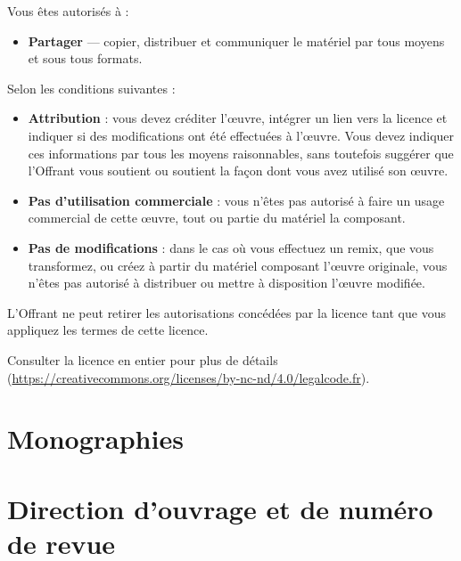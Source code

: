 \documentclass{article}
\begin{document}
\bigskip

    Vous êtes autorisés à :
    \begin{itemize}
        \item \textbf{Partager} --- copier, distribuer et communiquer le matériel par tous moyens et sous tous formats.
    \end{itemize}

\bigskip

    Selon les conditions suivantes :
    \begin{itemize}
        \item \textbf{Attribution} : vous devez créditer l'\oe{}uvre, intégrer un lien vers la licence et indiquer si des modifications ont été effectuées à l'\oe{}uvre. Vous devez indiquer ces informations par tous les moyens raisonnables, sans toutefois suggérer que l'Offrant vous soutient ou soutient la façon dont vous avez utilisé son \oe{}uvre.
        \item \textbf{Pas d'utilisation commerciale} : vous n'êtes pas autorisé à faire un usage commercial de cette \oe{}uvre, tout ou partie du matériel la composant. 
        \item \textbf{Pas de modifications} : dans le cas où vous effectuez un remix, que vous transformez, ou créez à partir du matériel composant l'\oe{}uvre originale, vous n'êtes pas autorisé à distribuer ou mettre à disposition l'\oe{}uvre modifiée. 
    \end{itemize}

\medskip

L'Offrant ne peut retirer les autorisations concédées par la licence tant que vous appliquez les termes de cette licence.

\medskip

    Consulter la licence en entier pour plus de détails (\url{https://creativecommons.org/licenses/by-nc-nd/4.0/legalcode.fr}). 

\newpage
\thispagestyle{empty}
\tableofcontents

\nocite{*}
\newpage

\section{Monographies}

\printbibliography[heading=subbibliography,keyword=monographie2020,heading=none]

\section{Direction d'ouvrage et de numéro de revue}
\end{document}
